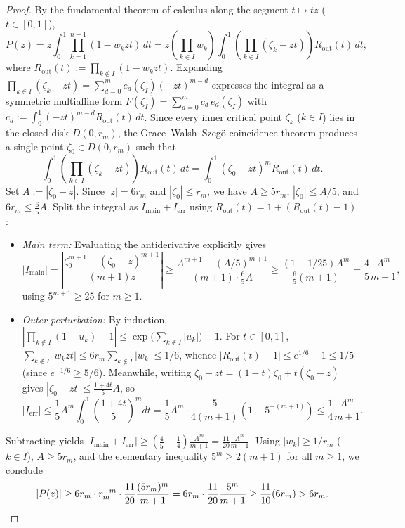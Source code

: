 \documentclass[11pt,a4paper]{article}
\theoremstyle{definition}
\theoremstyle{remark}
\begin{document}
\begin{proof}
By the fundamental theorem of calculus along the segment $t \mapsto t z$ ($t \in [0, 1]$),
\[
P(z) = z \int_0^1 \prod_{k=1}^{n-1} (1 - w_k z t)\, dt = z \left(\prod_{k \in I} w_k\right) \int_0^1 \left(\prod_{k \in I} (\zeta_k - z t)\right) R_{\mathrm{out}}(t)\, dt,
\]
where $R_{\mathrm{out}}(t) := \prod_{k \notin I} (1 - w_k z t)$. Expanding $\prod_{k \in I} (\zeta_k - z t) = \sum_{d=0}^m e_d(\zeta_I) (-z t)^{m - d}$ expresses the integral as a symmetric multiaffine form $F(\zeta_I) = \sum_{d=0}^m c_d\, e_d(\zeta_I)$ with $c_d := \int_0^1 (-z t)^{m - d} R_{\mathrm{out}}(t)\, dt$. Since every inner critical point $\zeta_k$ ($k \in I$) lies in the closed disk $\overline{D(0, r_m)}$, the Grace--Walsh--Szeg\"o coincidence theorem produces a single point $\zeta_0 \in \overline{D(0, r_m)}$ such that
\[
\int_0^1 \left(\prod_{k \in I} (\zeta_k - z t)\right) R_{\mathrm{out}}(t)\, dt = \int_0^1 (\zeta_0 - z t)^m R_{\mathrm{out}}(t)\, dt.
\]
Set $A := |\zeta_0 - z|$. Since $|z| = 6 r_m$ and $|\zeta_0| \le r_m$, we have $A \ge 5 r_m$, $|\zeta_0| \le A/5$, and $6 r_m \le \frac{6}{5} A$. Split the integral as $I_{\mathrm{main}} + I_{\mathrm{err}}$ using $R_{\mathrm{out}}(t) = 1 + (R_{\mathrm{out}}(t) - 1)$:
\begin{itemize}
\item \emph{Main term:} Evaluating the antiderivative explicitly gives
\[
|I_{\mathrm{main}}| = \left|\frac{\zeta_0^{m+1} - (\zeta_0 - z)^{m+1}}{(m + 1) z}\right| \ge \frac{A^{m+1} - (A/5)^{m+1}}{(m + 1) \cdot \frac{6}{5} A} \ge \frac{(1 - 1/25) A^m}{\frac{6}{5}(m + 1)} = \frac{4}{5}\frac{A^m}{m + 1},
\]
using $5^{m+1} \ge 25$ for $m \ge 1$.
\item \emph{Outer perturbation:} By induction, $\left|\prod_{k \notin I} (1 - u_k) - 1\right| \le \exp\bigl(\sum_{k \notin I} |u_k|\bigr) - 1$. For $t \in [0, 1]$, $\sum_{k \notin I} |w_k z t| \le 6 r_m \sum_{k \notin I} |w_k| \le 1/6$, whence $|R_{\mathrm{out}}(t) - 1| \le e^{1/6} - 1 \le 1/5$ (since $e^{-1/6} \ge 5/6$). Meanwhile, writing $\zeta_0 - z t = (1 - t)\zeta_0 + t(\zeta_0 - z)$ gives $|\zeta_0 - z t| \le \frac{1 + 4 t}{5} A$, so
\[
|I_{\mathrm{err}}| \le \frac{1}{5} A^m \int_0^1 \left(\frac{1 + 4 t}{5}\right)^m dt = \frac{1}{5} A^m \cdot \frac{5}{4(m + 1)}\left(1 - 5^{-(m+1)}\right) \le \frac{1}{4}\frac{A^m}{m + 1}.
\]
\end{itemize}
Subtracting yields $|I_{\mathrm{main}} + I_{\mathrm{err}}| \ge (\frac{4}{5} - \frac{1}{4}) \frac{A^m}{m + 1} = \frac{11}{20} \frac{A^m}{m + 1}$. Using $|w_k| \ge 1/r_m$ ($k \in I$), $A \ge 5 r_m$, and the elementary inequality $5^m \ge 2(m + 1)$ for all $m \ge 1$, we conclude
\[
|P(z)| \ge 6 r_m \cdot r_m^{-m} \cdot \frac{11}{20} \frac{(5 r_m)^m}{m + 1} = 6 r_m \cdot \frac{11}{20} \frac{5^m}{m + 1} \ge \frac{11}{10}(6 r_m) > 6 r_m. \qedhere
\]
\end{proof}
\end{document}
